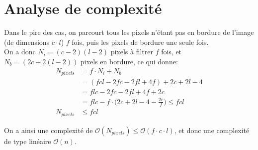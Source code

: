 \documentclass[a4paper, 11pt]{article}
\begin{document}
\section*{Analyse de complexité}
Dans le pire des cas, on parcourt tous les pixels n'étant pas en bordure de l'image (de dimensions $c\cdot l$) $f$ fois, puis les pixels de bordure une seule fois.\\

On a donc $N_i = (c - 2)(l-2)$ pixels à filtrer $f$ fois, et $N_b = (2c + 2(l-2))$ pixels en bordure, ce qui donne:
\begin{align}
N_{pixels} &= f \cdot N_i + N_b \nonumber \\
 &= (fcl-2fc-2fl+4f) + 2c+2l-4\nonumber \\
&= flc - 2fc - 2fl + 4f + 2c \nonumber \\
&= flc - f \cdot \bigg(2c + 2l - 4 - \frac{2c}{f}\bigg) \leq fcl \nonumber \\
N_{pixels} &\leq fcl \nonumber
\end{align}

On a ainsi une complexité de $\mathcal{O}(N_{pixels}) \leq \mathcal{O}(f\cdot c\cdot l)$, et donc une complexité de type linéaire $\mathcal{O}(n)$.
\end{document}

